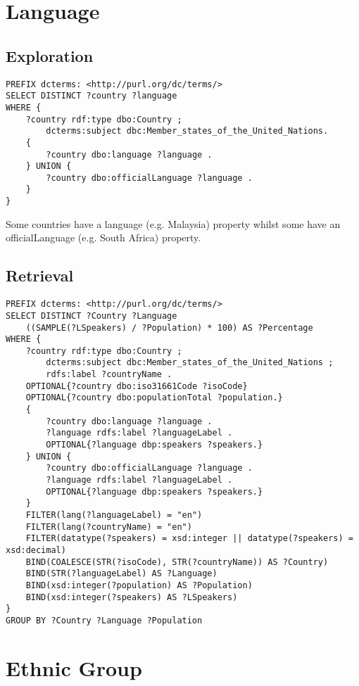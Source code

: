 \documentclass[11pt]{article}
\begin{document}
\newpage
\section{Language}
\subsection{Exploration}
{\footnotesize\begin{verbatim}
PREFIX dcterms: <http://purl.org/dc/terms/>
SELECT DISTINCT ?country ?language
WHERE {
    ?country rdf:type dbo:Country ;
        dcterms:subject dbc:Member_states_of_the_United_Nations.
    {
        ?country dbo:language ?language .
    } UNION {
        ?country dbo:officialLanguage ?language .
    }
}
\end{verbatim}}

Some countries have a language (e.g. Malaysia) property whilst some have an officialLanguage (e.g. South Africa) property. 


\subsection{Retrieval}
{\footnotesize\begin{verbatim}
PREFIX dcterms: <http://purl.org/dc/terms/>
SELECT DISTINCT ?Country ?Language
    ((SAMPLE(?LSpeakers) / ?Population) * 100) AS ?Percentage
WHERE {
    ?country rdf:type dbo:Country ;
        dcterms:subject dbc:Member_states_of_the_United_Nations ;
        rdfs:label ?countryName .
    OPTIONAL{?country dbo:iso31661Code ?isoCode}
    OPTIONAL{?country dbo:populationTotal ?population.}
    {
        ?country dbo:language ?language .
        ?language rdfs:label ?languageLabel .
        OPTIONAL{?language dbp:speakers ?speakers.}
    } UNION {
        ?country dbo:officialLanguage ?language .
        ?language rdfs:label ?languageLabel .
        OPTIONAL{?language dbp:speakers ?speakers.}
    }
    FILTER(lang(?languageLabel) = "en")
    FILTER(lang(?countryName) = "en")
    FILTER(datatype(?speakers) = xsd:integer || datatype(?speakers) = xsd:decimal)
    BIND(COALESCE(STR(?isoCode), STR(?countryName)) AS ?Country)
    BIND(STR(?languageLabel) AS ?Language)
    BIND(xsd:integer(?population) AS ?Population)
    BIND(xsd:integer(?speakers) AS ?LSpeakers)
}
GROUP BY ?Country ?Language ?Population
\end{verbatim}}

\section{Ethnic Group}
\end{document}
